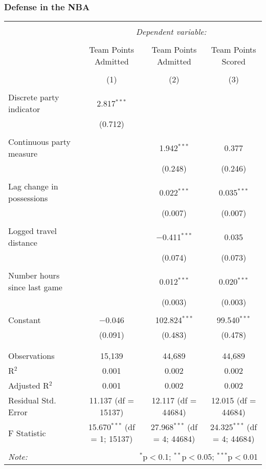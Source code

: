 \documentclass{beamer}
\begin{document}
\begin{frame}   \frametitle{Defense in the NBA}
  \begin{adjustwidth}{-.75cm}{}
  \tiny{  %
\begin{tabular}{@{\extracolsep{5pt}}lccc}  \\[-1.8ex]\hline  \hline \\[-1.8ex]   & \multicolumn{3}{c}{\textit{Dependent variable:}} \\  \cline{2-4}  \\[-1.8ex] & Team Points Admitted & Team Points Admitted & Team Points Scored \\  \\[-1.8ex] & (1) & (2) & (3)\\  \hline \\[-1.8ex]   Discrete party indicator & 2.817$^{***}$ &  &  \\    & (0.712) &  &  \\    & & & \\   Continuous party measure &  & 1.942$^{***}$ & 0.377 \\    &  & (0.248) & (0.246) \\    & & & \\   Lag change in possessions &  & 0.022$^{***}$ & 0.035$^{***}$ \\    &  & (0.007) & (0.007) \\    & & & \\   Logged travel distance &  & $-$0.411$^{***}$ & 0.035 \\    &  & (0.074) & (0.073) \\    & & & \\   Number hours since last game &  & 0.012$^{***}$ & 0.020$^{***}$ \\    &  & (0.003) & (0.003) \\    & & & \\   Constant & $-$0.046 & 102.824$^{***}$ & 99.540$^{***}$ \\    & (0.091) & (0.483) & (0.478) \\    & & & \\  \hline \\[-1.8ex]  Observations & 15,139 & 44,689 & 44,689 \\  R$^{2}$ & 0.001 & 0.002 & 0.002 \\  Adjusted R$^{2}$ & 0.001 & 0.002 & 0.002 \\  Residual Std. Error & 11.137 (df = 15137) & 12.117 (df = 44684) & 12.015 (df = 44684) \\  F Statistic & 15.670$^{***}$ (df = 1; 15137) & 27.968$^{***}$ (df = 4; 44684) & 24.325$^{***}$ (df = 4; 44684) \\  \hline  \hline \\[-1.8ex]  \textit{Note:}  & \multicolumn{3}{r}{$^{*}$p$<$0.1; $^{**}$p$<$0.05; $^{***}$p$<$0.01} \\  \end{tabular}  }
\end{adjustwidth} 
\end{frame}
\end{document}
